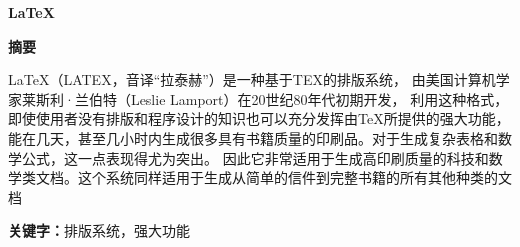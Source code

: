 
\begin{center}\heiti\sanhao\bfseries
    \LaTeX
\end{center}

\begin{center}\heiti\sanhao\textbf{
        摘\quad 要
    }
\end{center}

LaTeX（LATEX，音译“拉泰赫”）是一种基于ΤΕΧ的排版系统，
由美国计算机学家莱斯利·兰伯特（Leslie Lamport）在20世纪80年代初期开发，
利用这种格式，即使使用者没有排版和程序设计的知识也可以充分发挥由TeX所提供的强大功能，
能在几天，甚至几小时内生成很多具有书籍质量的印刷品。对于生成复杂表格和数学公式，这一点表现得尤为突出。
因此它非常适用于生成高印刷质量的科技和数学类文档。这个系统同样适用于生成从简单的信件到完整书籍的所有其他种类的文档
  
\noindent \textbf{关键字：}排版系统，强大功能

\clearpage